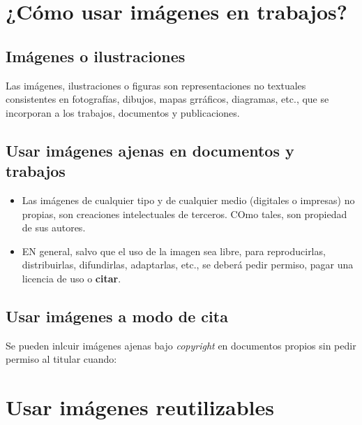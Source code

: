 \documentclass{article}
\begin{document}
\section{¿Cómo usar imágenes en trabajos?} \vspace{0.5cm}

\subsection{Imágenes o ilustraciones} \vspace{0.5cm}


Las imágenes, ilustraciones o figuras son representaciones no textuales consistentes en fotografías, dibujos, mapas grráficos, diagramas, etc., que se incorporan a los trabajos, documentos y publicaciones. \vspace{0.5cm}


\subsection{Usar imágenes ajenas en documentos y trabajos}

\begin{itemize}
	\item Las imágenes de cualquier tipo y de cualquier medio (digitales o impresas) no propias, son creaciones intelectuales de terceros. COmo tales, son propiedad de sus autores. 
	\item EN general, salvo que el uso de la imagen sea libre, para reproducirlas, distribuirlas, difundirlas, adaptarlas, etc., se deberá pedir permiso, pagar una licencia de uso o \textcolor{trueblue}{\textbf{citar}}.
\end{itemize} \vspace{0.5cm}


\subsection{ \textcolor{Cinnabar}{\textbf{Usar imágenes a modo de cita}} } \vspace{0.5cm}

Se pueden inlcuir imágenes ajenas bajo \emph{copyright} en documentos propios sin pedir permiso al titular cuando: \vspace{0.5cm}

\section{Usar imágenes reutilizables} \vspace{0.5cm}
\end{document}
